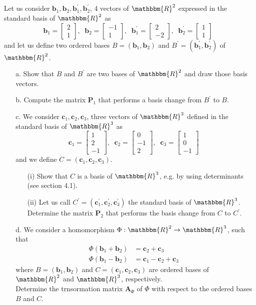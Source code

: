 \documentclass[a4paper,12pt]{article}
\newcommand{\R}{\mathbbm{R}}
\newcommand{\M}[1]{ \begin{bmatrix} #1 \end{bmatrix} }
\newcommand{\vecb}{\textbf{b}}
\newcommand{\vecc}{\textbf{c}}
\newcommand{\matA}{\textbf{A}}
\newcommand{\pr}{^\prime}
\begin{document}
\subsection{}
Let us consider $\vecb_1,\vecb_2, \vecb_1\pr, \vecb_2\pr$, 4 vectors of $\R^2$ expressed in the standard basis of $\R^2$ as 
$$\vecb_1 = \M{2\\1}, \;\; \vecb_2 = \M{-1\\1}, \;\; \vecb_1\pr = \M{2\\-2}, \;\; \vecb_2\pr = \M{1\\1}$$
and let us define two ordered bases $B = (\vecb_1,\vecb_2)$ and $B\pr = (\vecb_1\pr,\vecb_2\pr)$ of $\R^2$.
\begin{itemize}
 \item [a.] Show that $B$ and $B\pr$ are two bases of $\R^2$ and draw those basis vectors.
 \item [b.] Compute the matrix $\textbf{P}_1$ that performs a basis change from $B\pr$ to $B$.
 \item [c.] We consider $\vecc_1, \vecc_2, \vecc_3$, three vectors of $\R^3$ defined in the standard basis of $\R^3$ as 
 $$\vecc_1 = \M{1\\2\\-1}, \;\; \vecc_2 = \M{0\\-1\\2}, \;\; \vecc_3 = \M{1\\0\\-1}$$
 and we define $C = (\vecc_1, \vecc_2, \vecc_3)$.
 \begin{enumerate}
  \item [(i)] Show that $C$ is a basis of $\R^3$, e.g. by using determinants (see section 4.1).
  \item [(ii)] Let us call $C\pr = (\vecc_1\pr,\vecc_2\pr,\vecc_3\pr)$ the standard basis of $\R^3$. Determine the matrix $\textbf{P}_2$ that performs the basis change from $C$ to $C\pr$.
 \end{enumerate}
 \item [d.] We consider a homomorphism $\Phi: \R^2 \rightarrow \R^3$, such that
 \begin{align*}
  \Phi(\vecb_1 + \vecb_2) &= \vecc_2+\vecc_3 \\
  \Phi(\vecb_1 - \vecb_2) &= \vecc_1-\vecc_2+\vecc_3 
 \end{align*}
 where $B = (\vecb_1,\vecb_2)$ and $C = (\vecc_1,\vecc_2,\vecc_3)$ are ordered bases of $\R^2$ and $\R^3$, respectively. \\
 Determine the trnsormation matrix $\matA_\Phi$ of $\Phi$ with respect to the ordered bases $B$ and $C$.

\end{itemize}
\end{document}
